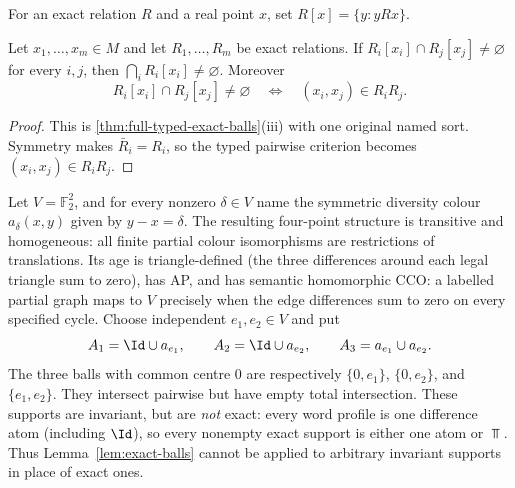 For an exact relation $R$ and a real point $x$, set
$R[x]=\{y:yRx\}$.
\begin{lemma}\label{lem:exact-balls}
Let $x_1,\dots,x_m\in M$ and let $R_1,\dots,R_m$ be exact relations.
If $R_i[x_i]\cap R_j[x_j]\ne\varnothing$ for every $i,j$, then
$\bigcap_iR_i[x_i]\ne\varnothing$. Moreover
\[
 R_i[x_i]\cap R_j[x_j]\ne\varnothing
 \quad\Longleftrightarrow\quad
 (x_i,x_j)\in R_iR_j.
\]
\end{lemma}
\begin{proof}
This is \cref{thm:full-typed-exact-balls}(iii) with one
original named sort. Symmetry makes $\bar R_i=R_i$, so the
typed pairwise criterion becomes $(x_i,x_j)\in R_iR_j$.
\end{proof}


\begin{example}
\label{ex:exact-ball-sharp}
Let $V=\mathbb F_2^2$, and for every nonzero $\delta\in V$ name the
symmetric diversity colour $a_\delta(x,y)$ given by $y-x=\delta$.
The resulting four-point structure is transitive and homogeneous:
all finite partial colour isomorphisms are restrictions of
translations.  Its age is triangle-defined (the three differences
around each legal triangle sum to zero), has AP, and has semantic
homomorphic CCO: a labelled partial graph maps to $V$ precisely
when the edge differences sum to zero on every specified cycle.
Choose independent $e_1,e_2\in V$ and put
\[
 A_1=\Id\cup a_{e_1},\qquad A_2=\Id\cup a_{e_2},
 \qquad A_3=a_{e_1}\cup a_{e_2}.
\]
The three balls with common centre $0$ are respectively
$\{0,e_1\}$, $\{0,e_2\}$, and $\{e_1,e_2\}$.
They intersect pairwise but have empty total intersection.
These supports are invariant, but are \emph{not} exact: every
word profile is one difference atom (including $\Id$), so every
nonempty exact support is either one atom or $\Top$.
Thus Lemma~\ref{lem:exact-balls} cannot be applied to arbitrary
invariant supports in place of exact ones.
\end{example}

